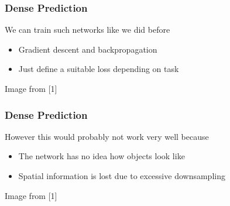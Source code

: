\documentclass[xetex,professionalfont]{beamer}
\begin{document}
\begin{frame}
	\frametitle{Dense Prediction}

	We can train such networks like we did before
	\begin{itemize}
		\item Gradient descent and backpropagation
		\item Just define a suitable loss depending on task
	\end{itemize}

	\bigskip

	\begin{center}
		{\centering Image from [1]}
	\end{center}

\end{frame}


\begin{frame}
	\frametitle{Dense Prediction}

	However this would probably not work very well because
	\begin{itemize}
		\item The network has no idea how objects look like
		\item Spatial information is lost due to excessive downsampling
	\end{itemize}

	\bigskip

	\begin{center}
		{\centering Image from [1]}
	\end{center}

\end{frame}
\end{document}
